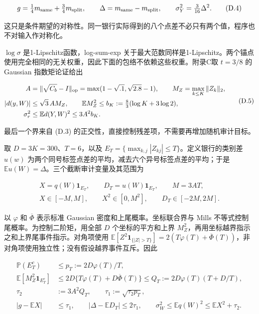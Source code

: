 \documentclass[11pt,a4paper]{article}
\begin{document}
\[
g=\tfrac14m_{\rm same}+\tfrac34m_{\rm split},\qquad
\Delta=m_{\rm same}-m_{\rm split},\qquad
\sigma_Y^2=\tfrac3{16}\Delta^2.
\tag{D.4}
\]

这只是条件期望的对称性。同一银行实际得到的八个点差不必只有两个值，程序也不对输入作对称化。

\(\log\sigma\) 是1-Lipschitz函数，log-sum-exp
关于最大范数同样是1-Lipschitz。两个锚点使用完全相同的无关权重，因此下面的包络不依赖这些权重。附录C取
\(t=3/8\) 的 Gaussian 指数矩论证给出

\[
\begin{aligned}
A&=\|\sqrt{C_b}-I\|_{\rm op}
=\max(1-\sqrt{.1},\sqrt{2.8}-1),\qquad
M_Z=\max_{k\le K}\|Z_k\|_2,\\
|d(y,W)|&\le\sqrt3\,A M_Z,\qquad
\mathbb E M_Z^2\le b_K:=\tfrac83(\log K+3\log2),\\
\sigma_r^2&\le\mathbb E d(Y,W)^2\le3A^2b_K.
\end{aligned}
\tag{D.5}
\]

最后一个界来自 (D.3)
的正交性，直接控制残差项，不需要再增加随机审计目标。

取 \(D=3K=300\)、\(T=6\)，以及
\(E_T=\{\max_{k,j}|Z_{kj}|\le T\}\)。定义银行的类别差 \(u(w)\)
为两个同号标签点差的平均，减去六个异号标签点差的平均；于是
\(\mathbb Eu(W)=\Delta\)。三个截断审计变量及其范围为

\[
\begin{gathered}
X=q(W)\mathbf1_{E_T},\qquad
D_T=u(W)\mathbf1_{E_T},\qquad M=3AT,\\
X\in[-M,M],\qquad X^2\in[0,M^2],\qquad D_T\in[-2M,2M].
\end{gathered}
\tag{D.6}
\]

以 \(\varphi\) 和 \(\overline\Phi\) 表示标准 Gaussian
密度和上尾概率。坐标联合界与 Mills
不等式控制尾概率。为控制二阶矩，用全部 \(D\) 个坐标的平方和上界
\(M_Z^2\)，再用坐标越界指示之和上界尾事件指示。对角项使用
\(\mathbb E[Z^2\mathbf1_{\{|Z|>T\}}]=2(T\varphi(T)+\overline\Phi(T))\)，非对角项使用独立性；没有假设越界事件互斥。因此

\[
\begin{aligned}
\mathbb P(E_T^c)&\le p_T:=2D\varphi(T)/T,\\
\mathbb E[M_Z^2\mathbf1_{E_T^c}]
&\le2D\{T\varphi(T)+D\overline\Phi(T)\}
\le Q_T:=2D\varphi(T)(T+D/T),\\
\tau_2&:=3A^2Q_T,\qquad \tau_1:=\sqrt{\tau_2p_T},\\
|g-\mathbb EX|&\le\tau_1,\qquad
|\Delta-\mathbb ED_T|\le2\tau_1,\qquad
\sigma_W^2\le\mathbb E q(W)^2\le\mathbb EX^2+\tau_2.
\end{aligned}
\tag{D.7}
\]
\end{document}

